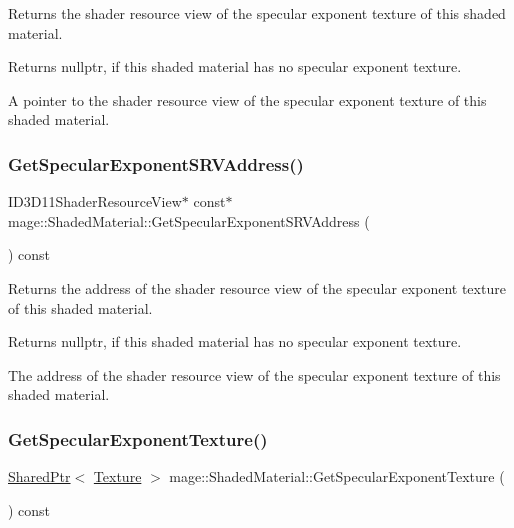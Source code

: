 Returns the shader resource view of the specular exponent texture of this shaded material.

\begin{DoxyReturn}{Returns}
{\ttfamily nullptr}, if this shaded material has no specular exponent texture. 

A pointer to the shader resource view of the specular exponent texture of this shaded material. 
\end{DoxyReturn}
\hypertarget{structmage_1_1_shaded_material_a25cfefef7f34cf03568c41b690264569}{}\label{structmage_1_1_shaded_material_a25cfefef7f34cf03568c41b690264569} 
\subsubsection{\texorpdfstring{Get\+Specular\+Exponent\+S\+R\+V\+Address()}{GetSpecularExponentSRVAddress()}}
{\footnotesize\ttfamily I\+D3\+D11\+Shader\+Resource\+View$\ast$ const$\ast$ mage\+::\+Shaded\+Material\+::\+Get\+Specular\+Exponent\+S\+R\+V\+Address (\begin{DoxyParamCaption}{ }\end{DoxyParamCaption}) const\hspace{0.3cm}{\ttfamily [noexcept]}}

Returns the address of the shader resource view of the specular exponent texture of this shaded material.

\begin{DoxyReturn}{Returns}
{\ttfamily nullptr}, if this shaded material has no specular exponent texture. 

The address of the shader resource view of the specular exponent texture of this shaded material. 
\end{DoxyReturn}
\hypertarget{structmage_1_1_shaded_material_a0d1d76e70949caf33e30aa474882b364}{}\label{structmage_1_1_shaded_material_a0d1d76e70949caf33e30aa474882b364} 
\subsubsection{\texorpdfstring{Get\+Specular\+Exponent\+Texture()}{GetSpecularExponentTexture()}}
{\footnotesize\ttfamily \hyperlink{namespacemage_a1e01ae66713838a7a67d30e44c67703e}{Shared\+Ptr}$<$ \hyperlink{classmage_1_1_texture}{Texture} $>$ mage\+::\+Shaded\+Material\+::\+Get\+Specular\+Exponent\+Texture (\begin{DoxyParamCaption}{ }\end{DoxyParamCaption}) const\hspace{0.3cm}{\ttfamily [noexcept]}}

